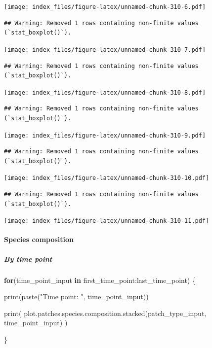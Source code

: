 \documentclass[
]{article}
\newenvironment{Shaded}{\begin{snugshade}}{\end{snugshade}}
\newcommand{\ControlFlowTok}[1]{\textcolor[rgb]{0.13,0.29,0.53}{\textbf{#1}}}
\newcommand{\FunctionTok}[1]{\textcolor[rgb]{0.00,0.00,0.00}{#1}}
\newcommand{\NormalTok}[1]{#1}
\newcommand{\SpecialCharTok}[1]{\textcolor[rgb]{0.00,0.00,0.00}{#1}}
\newcommand{\StringTok}[1]{\textcolor[rgb]{0.31,0.60,0.02}{#1}}
\begin{document}
\texttt{[image: index\_files/figure-latex/unnamed-chunk-310-6.pdf]}

\begin{verbatim}
## Warning: Removed 1 rows containing non-finite values (`stat_boxplot()`).
\end{verbatim}

\texttt{[image: index\_files/figure-latex/unnamed-chunk-310-7.pdf]}

\begin{verbatim}
## Warning: Removed 1 rows containing non-finite values (`stat_boxplot()`).
\end{verbatim}

\texttt{[image: index\_files/figure-latex/unnamed-chunk-310-8.pdf]}

\begin{verbatim}
## Warning: Removed 1 rows containing non-finite values (`stat_boxplot()`).
\end{verbatim}

\texttt{[image: index\_files/figure-latex/unnamed-chunk-310-9.pdf]}

\begin{verbatim}
## Warning: Removed 1 rows containing non-finite values (`stat_boxplot()`).
\end{verbatim}

\texttt{[image: index\_files/figure-latex/unnamed-chunk-310-10.pdf]}

\begin{verbatim}
## Warning: Removed 1 rows containing non-finite values (`stat_boxplot()`).
\end{verbatim}

\texttt{[image: index\_files/figure-latex/unnamed-chunk-310-11.pdf]}

\hypertarget{species-composition-1}{%
\paragraph{Species composition}\label{species-composition-1}}

\hypertarget{by-time-point}{%
\subparagraph{By time point}\label{by-time-point}}

\begin{Shaded}
\begin{Highlighting}[]
\ControlFlowTok{for}\NormalTok{(time\_point\_input }\ControlFlowTok{in}\NormalTok{ first\_time\_point}\SpecialCharTok{:}\NormalTok{last\_time\_point) \{}
  
  \FunctionTok{print}\NormalTok{(}\FunctionTok{paste}\NormalTok{(}\StringTok{"Time point: "}\NormalTok{, time\_point\_input))}
  
  \FunctionTok{print}\NormalTok{(}
    \FunctionTok{plot.patches.species.composition.stacked}\NormalTok{(patch\_type\_input,}
\NormalTok{                                             time\_point\_input)}
\NormalTok{  )}
  
\NormalTok{\}}
\end{Highlighting}
\end{Shaded}
\end{document}
